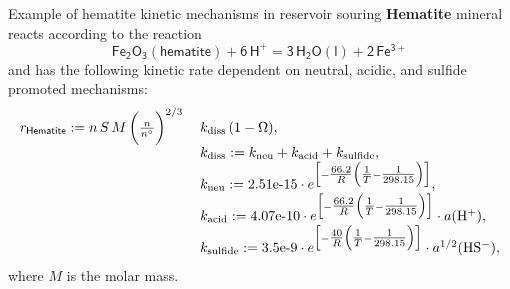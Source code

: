 %
\begin{frame}[fragile]{Example of hematite kinetic mechanisms in reservoir souring}
	\small
\alert{\bf Hematite} mineral reacts according to the reaction 
	\[\mathsf{Fe_{2}O_{3}(hematite)+6\,H^{+}=3\,H_{2}O(l)+2\,Fe^{3+}}\]
	and has the following kinetic rate dependent on neutral, acidic, and sulfide promoted mechanisms:
	\[
	\begin{array}{ll}
		r_{\sf Hematite}:=n \,S\,M\,\bigg(\frac{n}{n^\circ}\bigg)^{2/3}\: & k_{\rm diss}\,(1-\ensuremath{\Omega}), \\
		&  k_{\rm diss}:=k_{\rm neu}+k_{\rm acid}+k_{\rm sulfide},\\
		& k_{\rm neu}:=\mbox{2.51e-15}\cdot e^{\Big[-\tfrac{66.2}{R}\Big(\tfrac{1}{T}-\tfrac{1}{298.15}\Big)\Big]},\\
		& k_{\rm acid}:=\mbox{4.07e-10}\cdot e^{\Big[-\tfrac{66.2}{R}\Big(\tfrac{1}{T}-\tfrac{1}{298.15}\Big)\Big]}\cdot a({\rm H^{+}}),\\
		& k_{\rm sulfide}:=\mbox{3.5e-9}\cdot e^{\Big[-\tfrac{40}{R}\Big(\tfrac{1}{T}-\tfrac{1}{298.15}\Big)\Big]}\cdot a^{1/2}({\rm HS^{-}}),
	\end{array}
	\]
	where $M$ is the molar mass.
\end{frame}

